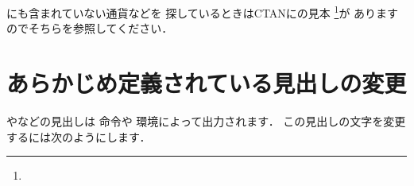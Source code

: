 にも含まれていない通貨などを
探しているときはCTANにの見本%
\footnote{}が
ありますのでそちらを参照してください．

\section{あらかじめ定義されている見出しの変更}
%
やなどの見出しは 命令や
環境によって出力されます．
この見出しの文字を変更するには次のようにします．

